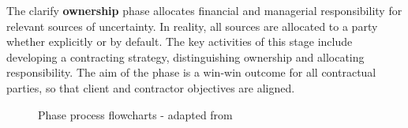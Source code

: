 The clarify \textbf{ownership} phase allocates financial and managerial responsibility for relevant sources of uncertainty.
In reality, all sources are allocated to a party whether explicitly or by default.
The key activities of this stage include developing a contracting strategy, distinguishing ownership and allocating responsibility.
The aim of the phase is a win-win outcome for all contractual parties, so that client and contractor objectives are aligned.

\begin{figure}[!h]
  \centering
{} \quad
{}
\caption{Phase process flowcharts - adapted from \cite{chapman}}
\label{Figure:OwnQuant}
\end{figure}

